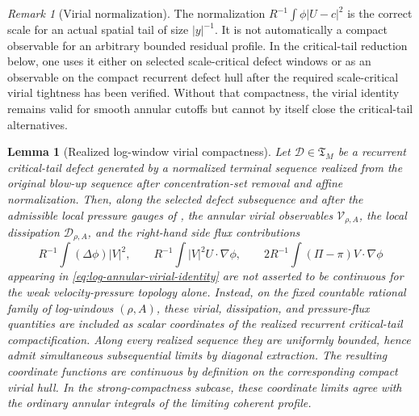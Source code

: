 \documentclass[11pt]{amsart}
\numberwithin{equation}{section}
\theoremstyle{plain}
\newtheorem{lemma}[lemma]{Lemma}
\theoremstyle{definition}
\theoremstyle{remark}
\newtheorem{remark}[remark]{Remark}
\newcommand{\Tcrit}{\mathfrak T_M}
\begin{document}
\begin{remark}[Virial normalization]
\label{rem:virial-normalization-warning}
The normalization \(R^{-1}\int\phi |U-c|^2\) is the correct scale for an actual
spatial tail of size \(|y|^{-1}\).  It is not automatically a compact observable
for an arbitrary bounded residual profile.  In the critical-tail reduction
below, one uses it either on selected scale-critical defect windows or as an
observable on the compact recurrent defect hull after the required
scale-critical virial tightness has been verified.  Without that compactness,
the virial identity remains valid for smooth annular cutoffs but cannot by
itself close the critical-tail alternatives.
\end{remark}

\begin{lemma}[Realized log-window virial compactness]
\label{lem:realized-log-window-virial-compactness}
Let \(\mathcal D\in\Tcrit\) be a recurrent critical-tail defect generated by a
normalized terminal sequence realized from the original blow-up sequence after concentration-set removal and
affine normalization.  Then, along the selected defect subsequence and after
the admissible local pressure gauges of
, the annular virial observables
\(\mathcal V_{\rho,A}\), the local dissipation \(\mathcal D_{\rho,A}\), and the
right-hand side flux contributions
\[
   R^{-1}\int(\Delta\phi)|V|^2 ,\qquad
   R^{-1}\int|V|^2 U\cdot\nabla\phi ,\qquad
   2R^{-1}\int(\Pi-\pi)V\cdot\nabla\phi
\]
appearing in \eqref{eq:log-annular-virial-identity} are \emph{not} asserted to
be continuous for the weak velocity-pressure topology alone.  Instead, on the
fixed countable rational family of log-windows \((\rho,A)\), these virial,
dissipation, and pressure-flux quantities are included as scalar coordinates of
the realized recurrent critical-tail compactification.  Along every realized
sequence they are uniformly bounded, hence admit simultaneous subsequential
limits by diagonal extraction.  The resulting coordinate functions are
continuous by definition on the corresponding compact virial hull.  In the
strong-compactness subcase, these coordinate limits agree with the ordinary
annular integrals of the limiting coherent profile.
\end{lemma}
\end{document}
